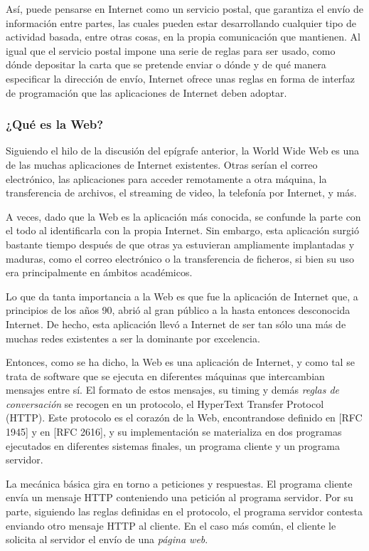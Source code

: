 \documentclass[a4paper]{report}
\begin{document}
    Así, puede pensarse en Internet como un servicio postal, que garantiza el envío de información entre partes, las cuales pueden estar desarrollando cualquier tipo de actividad basada, entre otras cosas, en la propia comunicación que mantienen. Al igual que el servicio postal impone una serie de reglas para ser usado, como dónde depositar la carta que se pretende enviar o dónde y de qué manera especificar la dirección de envío, Internet ofrece unas reglas en forma de interfaz de programación que las aplicaciones de Internet deben adoptar.
    
    \subsubsection{¿Qué es la Web?}
    Siguiendo el hilo de la discusión del epígrafe anterior, la World Wide Web es una de las muchas aplicaciones de Internet existentes. Otras serían el correo electrónico, las aplicaciones para acceder remotamente a otra máquina, la transferencia de archivos, el streaming de video, la telefonía por Internet, y más.
    
    A veces, dado que la Web es la aplicación más conocida, se confunde la parte con el todo al identificarla con la propia Internet. Sin embargo, esta aplicación surgió bastante tiempo después de que otras ya estuvieran ampliamente implantadas y maduras, como el correo electrónico o la transferencia de ficheros, si bien su uso era principalmente en ámbitos académicos.
    
    Lo que da tanta importancia a la Web es que fue la aplicación de Internet que, a principios de los años 90, abrió al gran público a la hasta entonces desconocida Internet. De hecho, esta aplicación llevó a Internet de ser tan sólo una más de muchas redes existentes a ser la dominante por excelencia.
    
    Entonces, como se ha dicho, la Web es una aplicación de Internet, y como tal se trata de software que se ejecuta en diferentes máquinas que intercambian mensajes entre sí. El formato de estos mensajes, su timing y demás \emph{reglas de conversación} se recogen en un protocolo, el HyperText Transfer Protocol (HTTP). Este protocolo es el corazón de la Web, encontrandose definido en [RFC 1945] y en [RFC 2616], y su implementación se materializa en dos programas ejecutados en diferentes sistemas finales, un programa cliente y un programa servidor.
    
    La mecánica básica gira en torno a peticiones y respuestas. El programa cliente envía un mensaje HTTP conteniendo una petición al programa servidor. Por su parte, siguiendo las reglas definidas en el protocolo, el programa servidor contesta enviando otro mensaje HTTP al cliente. En el caso más común, el cliente le solicita al servidor el envío de una \emph{página web}.
    
\end{document}
